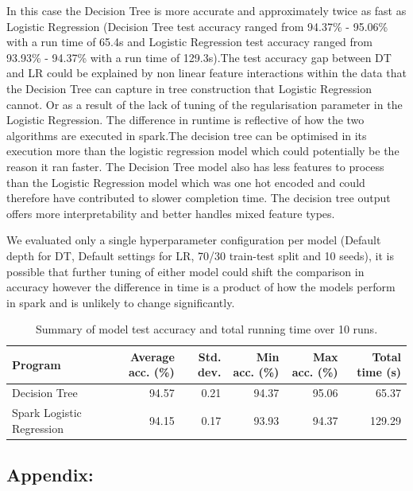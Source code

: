 \documentclass[12pt]{article}
\begin{document}
In this case the Decision Tree is more accurate and approximately twice as fast as Logistic Regression (Decision Tree test accuracy ranged from 94.37\% - 95.06\% with a run time of 65.4s and Logistic Regression test accuracy ranged from 93.93\% - 94.37\% with a run time of 129.3s).The test accuracy gap between DT and LR could be explained by non linear feature interactions within the data that the Decision Tree can capture in tree construction that Logistic Regression cannot. Or as a result of the lack of tuning of the regularisation parameter in the Logistic Regression. The difference in runtime is reflective of how the two algorithms are executed in spark.The decision tree can be optimised in its execution more than the logistic regression model which could potentially be the reason it ran faster. The Decision Tree model also has less features to process than the Logistic Regression model which was one hot encoded and could therefore have contributed to slower completion time. The decision tree output offers more interpretability and better handles mixed feature types.

We evaluated only a single hyperparameter configuration per model (Default depth for DT, Default settings for LR, 70/30 train-test split and 10 seeds), it is possible that further tuning of either model could shift the comparison in accuracy however the difference in time is a product of how the models perform in spark and is unlikely to change significantly.


\begin{table}[H]
\centering
\caption{Summary of model test accuracy and total running time over 10 runs.}
\begin{tabular}{lrrrrr}
\hline
Program & Average acc. (\%) & Std. dev. & Min acc. (\%) & Max acc. (\%) & Total time (s) \\
\hline
Decision Tree              & 94.57 & 0.21 & 94.37 & 95.06 & 65.37 \\
Spark Logistic Regression  & 94.15 & 0.17 & 93.93 & 94.37 & 129.29 \\
\hline
\end{tabular}
\end{table}

\FloatBarrier

\subsection{Appendix:}
\end{document}
